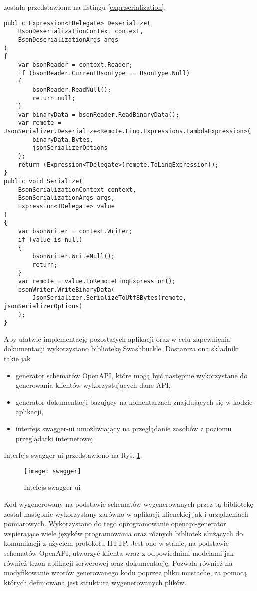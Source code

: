 została przedstawiona na listingu \ref{expr:serialization}.
\begin{lstlisting}[language={[Sharp]C},caption={Serializacja ekspresji},label={expr:serialization},captionpos=b]
public Expression<TDelegate> Deserialize(
    BsonDeserializationContext context,
    BsonDeserializationArgs args
)
{
    var bsonReader = context.Reader;
    if (bsonReader.CurrentBsonType == BsonType.Null)
    {
        bsonReader.ReadNull();
        return null;
    }
    var binaryData = bsonReader.ReadBinaryData();
    var remote = JsonSerializer.Deserialize<Remote.Linq.Expressions.LambdaExpression>(
        binaryData.Bytes,
        jsonSerializerOptions
    );
    return (Expression<TDelegate>)remote.ToLinqExpression();
}
public void Serialize(
    BsonSerializationContext context,
    BsonSerializationArgs args,
    Expression<TDelegate> value
)
{
    var bsonWriter = context.Writer;
    if (value is null)
    {
        bsonWriter.WriteNull();
        return;
    }
    var remote = value.ToRemoteLinqExpression();
    bsonWriter.WriteBinaryData(
        JsonSerializer.SerializeToUtf8Bytes(remote, jsonSerializerOptions)
    );
}
\end{lstlisting}

Aby ułatwić implementację pozostałych aplikacji oraz w celu zapewnienia dokumentacji
wykorzystano bibliotekę Swashbuckle. Dostarcza ona składniki takie jak 
\begin{itemize}
  \item generator schematów OpenAPI, które mogą być następnie wykorzystane do generowania klientów
wykorzystujących dane API,
  \item generator dokumentacji bazujący na komentarzach znajdujących się w kodzie aplikacji,
  \item interfejs swagger-ui umożliwiający na przeglądanie zasobów z poziomu przeglądarki internetowej.
\end{itemize}
Interfejs swagger-ui przedstawiono na Rys. \ref{swagger:interface}.
\begin{figure}[h!]
  \centering
  \texttt{[image: swagger]}
  \caption{Intefejs swagger-ui}
  \label{swagger:interface}
\end{figure}
Kod wygenerowany na podstawie schematów wygenerowanych przez tą bibliotekę został następnie
wykorzystany zarówno w aplikacji klienckiej jak i urządzeniach pomiarowych.
Wykorzystano do tego oprogramowanie openapi-generator wspierające wiele języków
programowania oraz różnych bibliotek służących do komunikacji z użyciem protokołu HTTP.
Jest ono w stanie, na podstawie schematów OpenAPI, utworzyć klienta wraz z odpowiednimi
modelami jak również trzon aplikacji serwerowej oraz dokumentację. Pozwala również
na modyfikowanie wzorów generowanego kodu poprzez pliku mustache, za pomocą których
definiowana jest struktura wygenerowanych plików.



